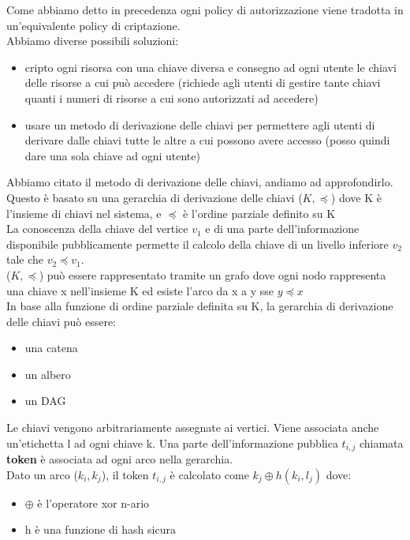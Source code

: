 Come abbiamo detto in precedenza ogni policy di autorizzazione viene tradotta in un'equivalente policy di criptazione.\\
Abbiamo diverse possibili soluzioni:
\begin{itemize}
    \item cripto ogni risorsa con una chiave diversa e consegno ad ogni utente le chiavi delle risorse a cui può accedere (richiede agli utenti di gestire tante chiavi quanti i numeri di risorse a cui sono autorizzati ad accedere)
    \item usare un metodo di derivazione delle chiavi per permettere agli utenti di derivare dalle chiavi tutte le altre a cui possono avere accesso (posso quindi dare una sola chiave ad ogni utente)
\end{itemize}
Abbiamo citato il metodo di derivazione delle chiavi, andiamo ad approfondirlo.\\
Questo è basato su una gerarchia di derivazione delle chiavi (\(K, \preceq\)) dove K è l'insieme di chiavi nel sistema, e \(\preceq\) è l'ordine parziale definito su K \\
La conoscenza della chiave del vertice \(v_1\) e di una parte dell'informazione disponibile pubblicamente permette il calcolo della chiave di un livello inferiore \(v_2\) tale che \(v_2 \preceq v_1 \).\\
(\(K, \preceq\)) può essere rappresentato tramite un grafo dove ogni nodo rappresenta una chiave x nell'insieme K ed esiste l'arco da x a y sse \(y \preceq x \) \\
In base alla funzione di ordine parziale definita su K, la gerarchia di derivazione delle chiavi può essere:
\begin{itemize}
    \item una catena
    \item un albero
    \item un DAG
\end{itemize}
Le chiavi vengono arbitrariamente assegnate ai vertici. Viene associata anche un'etichetta l ad ogni chiave k. Una parte dell'informazione pubblica \(t_{i,j}\) chiamata \textbf{token} è associata ad ogni arco nella gerarchia.\\
Dato un arco (\(k_i, k_j\)), il token \(t_{i,j}\) è calcolato come \(k_j \oplus h(k_i, l_j)\) dove:
\begin{itemize}
    \item \(\oplus\) è l'operatore xor n-ario
    \item h è una funzione di hash sicura
\end{itemize}
